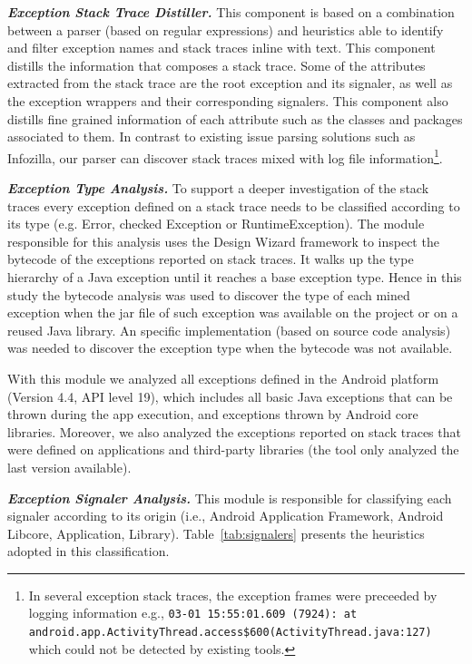 \documentclass[conference]{IEEEtran}
\begin{document}
\emph{\textbf{Exception Stack Trace Distiller.}}
This component is based on a combination between a parser (based on regular expressions) 
and heuristics able to identify and filter exception names and stack traces inline with text. 
This component distills the information that composes a stack trace.
 Some of the attributes extracted from the stack trace are
 the root exception and its signaler, as well as the exception wrappers and their corresponding signalers. 
This component also distills fine grained information of each attribute such as the classes and packages associated to them.
In contrast to existing issue parsing solutions such as Infozilla, our parser
 can discover stack traces mixed with log file information\footnote{In several 
exception stack traces, the exception frames were preceeded by logging information e.g., 
\texttt{03-01 15:55:01.609 (7924): at android.app.ActivityThread.access\$600(ActivityThread\-.java:127)} which could not be detected by existing tools.}.

\emph{\textbf{Exception Type Analysis.}} To support a deeper investigation of the 
stack traces every exception defined on a stack trace needs to be classified according to its type
(e.g. Error, checked Exception or RuntimeException). The module responsible for this analysis 
uses the Design Wizard framework \cite{Brunet09} to inspect the bytecode of the exceptions reported 
on stack traces.  It walks up the type hierarchy of a Java exception until it reaches 
a base exception type. Hence in this study the bytecode analysis was used to discover the type 
of each mined exception when the jar file of such exception was available on the project or 
on a reused  Java library. An specific implementation (based on source code analysis)
 was needed to discover the exception type when the bytecode was not available.

With this module we analyzed all exceptions defined in the Android platform (Version 4.4, API level 19),
which includes all basic Java exceptions that can be thrown during the app execution,
and exceptions thrown by Android core libraries. Moreover, we also analyzed the 
exceptions reported on stack traces that were defined on applications and third-party libraries 
(the tool only analyzed the last version available).

\emph{\textbf{Exception Signaler Analysis.}}
This module is responsible for classifying each signaler according 
to its origin (i.e., Android Application Framework, Android Libcore, Application, Library). 
Table~\ref{tab:signalers} presents the heuristics adopted in this classification.
\end{document}
